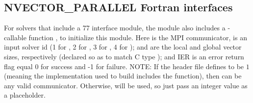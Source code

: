 \subsection{NVECTOR\_PARALLEL Fortran interfaces}
\label{ss:nvec_par_fortran}

For solvers that include a {\F} 77 interface module, the {\nvecp} module
also includes a {\F}-callable function
,
to initialize this {\nvecp} module.  Here  is the MPI communicator,
 is an input solver id (1 for {\cvode}, 2 for {\ida}, 3 for {\kinsol},
4 for {\arkode});  and  are the local and global
vector sizes, respectively (declared so as to match C type );
and IER is an error return flag equal 0 for success and -1 for failure.
{\warn}NOTE: If the header file  defines
 to be $1$ (meaning the {\mpi}
implementation used to build {\sundials} includes the
 function), then  can be any valid
{\mpi} communicator. Otherwise,  will be used, so
just pass an integer value as a placeholder.
